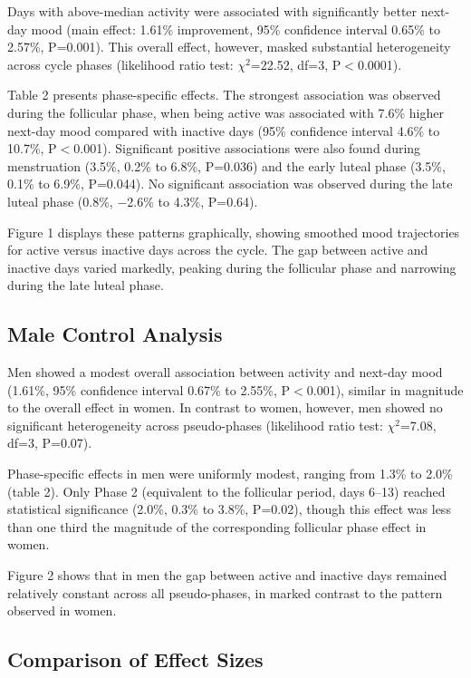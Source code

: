 \documentclass[12pt]{article}
\begin{document}
Days with above-median activity were associated with significantly better next-day mood (main effect: 1.61\% improvement, 95\% confidence interval 0.65\% to 2.57\%, P=0.001). This overall effect, however, masked substantial heterogeneity across cycle phases (likelihood ratio test: $\chi^2$=22.52, df=3, P$<$0.0001).

Table 2 presents phase-specific effects. The strongest association was observed during the follicular phase, when being active was associated with 7.6\% higher next-day mood compared with inactive days (95\% confidence interval 4.6\% to 10.7\%, P$<$0.001). Significant positive associations were also found during menstruation (3.5\%, 0.2\% to 6.8\%, P=0.036) and the early luteal phase (3.5\%, 0.1\% to 6.9\%, P=0.044). No significant association was observed during the late luteal phase (0.8\%, $-$2.6\% to 4.3\%, P=0.64).

Figure 1 displays these patterns graphically, showing smoothed mood trajectories for active versus inactive days across the cycle. The gap between active and inactive days varied markedly, peaking during the follicular phase and narrowing during the late luteal phase.

\subsection*{Male Control Analysis}

Men showed a modest overall association between activity and next-day mood (1.61\%, 95\% confidence interval 0.67\% to 2.55\%, P$<$0.001), similar in magnitude to the overall effect in women. In contrast to women, however, men showed no significant heterogeneity across pseudo-phases (likelihood ratio test: $\chi^2$=7.08, df=3, P=0.07).

Phase-specific effects in men were uniformly modest, ranging from 1.3\% to 2.0\% (table 2). Only Phase 2 (equivalent to the follicular period, days 6--13) reached statistical significance (2.0\%, 0.3\% to 3.8\%, P=0.02), though this effect was less than one third the magnitude of the corresponding follicular phase effect in women.

Figure 2 shows that in men the gap between active and inactive days remained relatively constant across all pseudo-phases, in marked contrast to the pattern observed in women.

\subsection*{Comparison of Effect Sizes}
\end{document}
